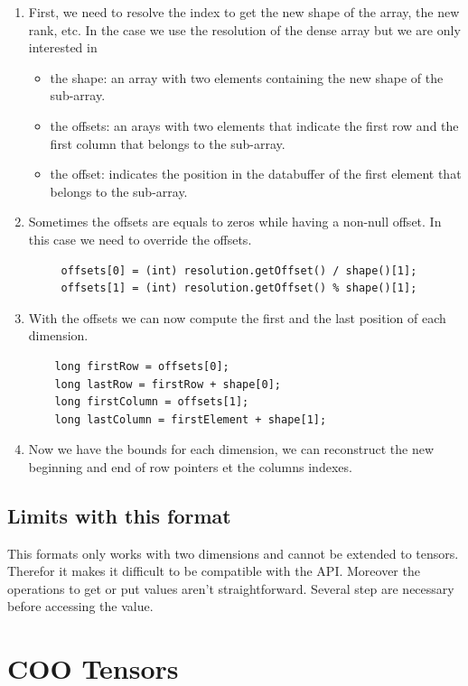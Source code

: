 \begin{enumerate}
\item First, we need to resolve the index to get the new shape of the array, the new rank, etc. In the case we use the resolution of the dense array but we are only interested in
\begin{itemize}
	\item the shape: an array with two elements containing the new shape of the sub-array.
	\item the offsets: an arays with two elements that indicate the first row and the first column that belongs to the sub-array.
	\item the offset: indicates the position in the databuffer of the first element that belongs to the sub-array.
\end{itemize}
 \item Sometimes the offsets are equals to zeros while having a non-null offset. In this case we need to override the offsets.
\begin{lstlisting}
	 offsets[0] = (int) resolution.getOffset() / shape()[1];
	 offsets[1] = (int) resolution.getOffset() % shape()[1];
\end{lstlisting}
\item With the offsets we can now compute the first and the last position of each dimension.
\begin{lstlisting}
	long firstRow = offsets[0];
	long lastRow = firstRow + shape[0];
	long firstColumn = offsets[1];
	long lastColumn = firstElement + shape[1];
\end{lstlisting}
\item Now we have the bounds for each dimension, we can reconstruct the new beginning and end of row pointers et the columns indexes.
\end{enumerate}


\subsection{Limits with this format}

This formats only works with two dimensions and cannot be extended to tensors. Therefor it makes it difficult to be compatible with the API.
Moreover the operations to get or put values aren't straightforward. Several step are necessary before accessing the value.

\section{COO Tensors}
